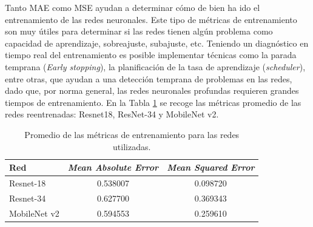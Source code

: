 Tanto MAE como MSE ayudan a determinar cómo de bien ha ido el entrenamiento de las redes neuronales. Este tipo de métricas de entrenamiento son muy útiles para determinar si las redes tienen algún problema como capacidad de aprendizaje, sobreajuste, subajuste, etc. Teniendo un diagnóstico en tiempo real del entrenamiento es posible implementar técnicas como la parada temprana (\textit{Early stopping}), la planificación de la tasa de aprendizaje (\textit{scheduler}), entre otras, que ayudan a una detección temprana de problemas en las redes, dado que, por norma general, las redes neuronales profundas requieren grandes tiempos de entrenamiento. En la Tabla \ref{tab:mae_mse} se recoge las métricas promedio de las redes reentrenadas: Resnet18, ResNet-34 y MobileNet v2.

\begin{table}[ht!]
\ttfamily\small
\centering
\begin{tabular}{|l|c|c|}
\hline
\rowcolor[HTML]{C0C0C0} 
\textbf{Red}                         & \textit{\textbf{Mean Absolute Error}} & \textit{\textbf{Mean Squared Error}} \\ \hline
\cellcolor[HTML]{EFEFEF}Resnet-18    &          0.538007                                  &              0.098720                             \\ \hline
\cellcolor[HTML]{EFEFEF}Resnet-34    &          0.627700                                  &              0.369343                             \\ \hline
\cellcolor[HTML]{EFEFEF}MobileNet v2 &          0.594553                                  &              0.259610                             \\ \hline
\end{tabular}
\caption{Promedio de las métricas de entrenamiento para las redes utilizadas.}
\label{tab:mae_mse}
\end{table}


